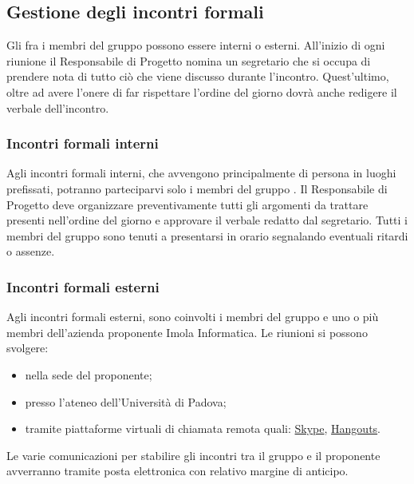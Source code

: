 \subsection{Gestione degli incontri formali}
Gli  fra i membri del gruppo possono essere interni o esterni.
All’inizio di ogni riunione il Responsabile di Progetto nomina un segretario che si occupa di prendere nota di tutto ciò che viene discusso durante l’incontro.
Quest’ultimo, oltre ad avere l’onere di far rispettare l’ordine del giorno dovrà anche redigere il verbale dell’incontro.

\subsubsection{Incontri formali interni}
Agli incontri formali interni, che avvengono principalmente di persona in luoghi prefissati, potranno parteciparvi solo i membri del gruppo \Gruppo.
Il Responsabile di Progetto deve organizzare preventivamente tutti gli argomenti da trattare presenti nell’ordine del giorno e approvare il verbale redatto dal segretario.
Tutti i membri del gruppo sono tenuti a presentarsi in orario segnalando eventuali ritardi o assenze.

\subsubsection{Incontri formali esterni}
Agli incontri formali esterni, sono coinvolti i membri del gruppo \Gruppo  e uno o più membri dell'azienda proponente Imola Informatica.
Le riunioni si possono svolgere:
\begin{itemize}
	\item nella sede del proponente;
	\item presso l’ateneo dell’Università di Padova;
	\item tramite piattaforme virtuali di chiamata remota quali: \href{https://www.skype.com/it/}{Skype}, \href{https://hangouts.google.com/}{Hangouts}.
\end{itemize}

Le varie comunicazioni per stabilire gli incontri tra il gruppo e il proponente avverranno tramite posta elettronica con relativo margine di anticipo.
